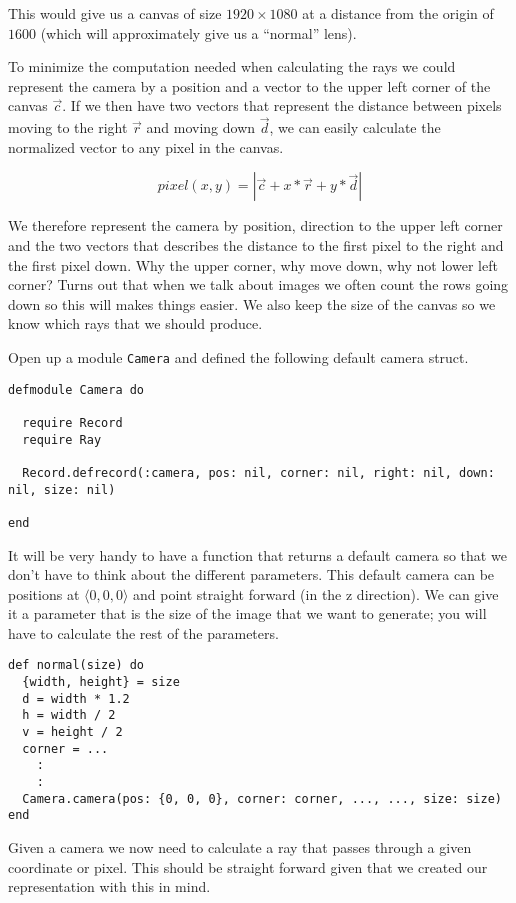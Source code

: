 \documentclass[a4paper,11pt]{article}
\begin{document}
This would give us a canvas of size $1920 \times 1080$ at a distance
from the origin of $1600$ (which will approximately give us a
``normal'' lens).

To minimize the computation needed when calculating the rays we could
represent the camera by a position and a vector to the upper left
corner of the canvas $\vec{c}$. If we then have two vectors that represent the
distance between pixels moving to the right $\vec{r}$ and moving down $\vec{d}$, we can
easily calculate the normalized vector to any pixel in the canvas.

$$pixel(x,y) = |\vec{c} + x*\vec{r} + y*\vec{d}|$$

We therefore represent the camera by position, direction to the upper
left corner and the two vectors that describes the distance to the
first pixel to the right and the first pixel down. Why the upper
corner, why move down, why not lower left corner? Turns out that when
we talk about images we often count the rows going down so this will
makes things easier. We also keep the size of the canvas so we know
which rays that we should produce.

Open up a module {\tt Camera} and defined the following default camera struct. 

\begin{verbatim}
defmodule Camera do

  require Record
  require Ray

  Record.defrecord(:camera, pos: nil, corner: nil, right: nil, down: nil, size: nil)
  
end
\end{verbatim}

It will be very handy to have a function that returns a default
camera so that we don't have to think about the different
parameters. This default camera can be positions at
$\langle 0,0,0\rangle$ and point straight forward (in the z
direction). We can give it a parameter that is the size of the image
that we want to generate; you will have to calculate the rest of the
parameters.

\begin{verbatim}
def normal(size) do
  {width, height} = size
  d = width * 1.2
  h = width / 2
  v = height / 2
  corner = ...
    :
    :
  Camera.camera(pos: {0, 0, 0}, corner: corner, ..., ..., size: size)
end
\end{verbatim}

Given a camera we now need to calculate a ray that passes through a
given coordinate or pixel. This should be straight forward given that
we created our representation with this in mind.
\end{document}
